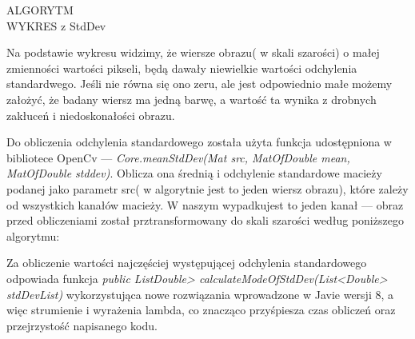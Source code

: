 \documentclass[a4paper,12pt]{article}
\begin{document}
			ALGORYTM\\
			WYKRES z StdDev
			
			Na podstawie wykresu widzimy, że wiersze obrazu( w skali szarości) o ma\l ej zmienności wartości pikseli, będą dawa\l y niewielkie wartości odchylenia standardwego. Jeśli nie równa się ono zeru, ale jest odpowiednio ma\l e możemy za\l ożyć, że badany wiersz ma jedną barwę, a wartość ta wynika z drobnych zak\l uceń i niedoskona\l ości obrazu.
			
			Do obliczenia odchylenia standardowego została użyta funkcja udostępniona w bibliotece OpenCv --- \textit {Core.meanStdDev(Mat src, MatOfDouble mean, MatOfDouble stddev)}. Oblicza ona średnią i odchylenie standardowe macieży podanej jako parametr src( w algorytnie jest to jeden wiersz obrazu), które zależy od wszystkich kanałów macieży. W naszym wypadkujest to jeden kanał --- obraz przed obliczeniami został prztransformowany do skali szarości według poniższego algorytmu:
			 
						
			Za obliczenie wartości najczęściej występującej odchylenia standardowego odpowiada funkcja 
			\textit {public List\<Double> calculateModeOfStdDev(List<Double> stdDevList)} wykorzystująca nowe rozwiązania wprowadzone w Javie wersji 8, a więc strumienie i wyrażenia lambda, co znacząco przyśpiesza czas obliczeń oraz przejrzystość napisanego kodu. 
			
			
		
\end{document}
